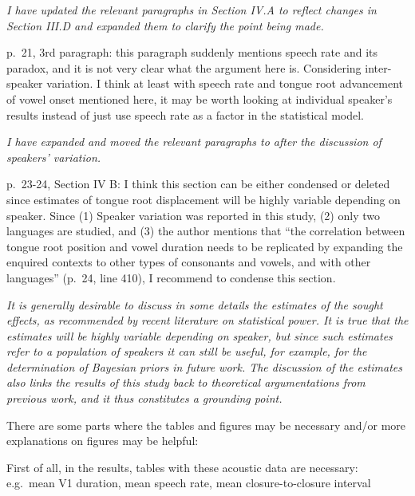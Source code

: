 \documentclass[]{article}
\begin{document}
\begin{adjustwidth}{1cm}{} \textit{
I have updated the relevant paragraphs in Section IV.A to reflect changes in Section III.D and expanded them to clarify the point being made.
} \end{adjustwidth}

p.~21, 3rd paragraph: this paragraph suddenly mentions speech rate and
its paradox, and it is not very clear what the argument here is.
Considering inter-speaker variation. I think at least with speech rate
and tongue root advancement of vowel onset mentioned here, it may be
worth looking at individual speaker's results instead of just use speech
rate as a factor in the statistical model.

\begin{adjustwidth}{1cm}{} \textit{
I have expanded and moved the relevant paragraphs to after the discussion of speakers' variation.
} \end{adjustwidth}

p.~23-24, Section IV B: I think this section can be either condensed or
deleted since estimates of tongue root displacement will be highly
variable depending on speaker. Since (1) Speaker variation was reported
in this study, (2) only two languages are studied, and (3) the author
mentions that ``the correlation between tongue root position and vowel
duration needs to be replicated by expanding the enquired contexts to
other types of consonants and vowels, and with other languages'' (p.~24,
line 410), I recommend to condense this section.

\begin{adjustwidth}{1cm}{} \textit{
It is generally desirable to discuss in some details the estimates of the sought effects, as recommended by recent literature on statistical power. It is true that the estimates will be highly variable depending on speaker, but since such estimates refer to a population of speakers it can still be useful, for example, for the determination of Bayesian priors in future work. The discussion of the estimates also links the results of this study back to theoretical argumentations from previous work, and it thus constitutes a grounding point.
} \end{adjustwidth}

There are some parts where the tables and figures may be necessary
and/or more explanations on figures may be helpful:

First of all, in the results, tables with these acoustic data are
necessary: e.g.~mean V1 duration, mean speech rate, mean
closure-to-closure interval
\end{document}
